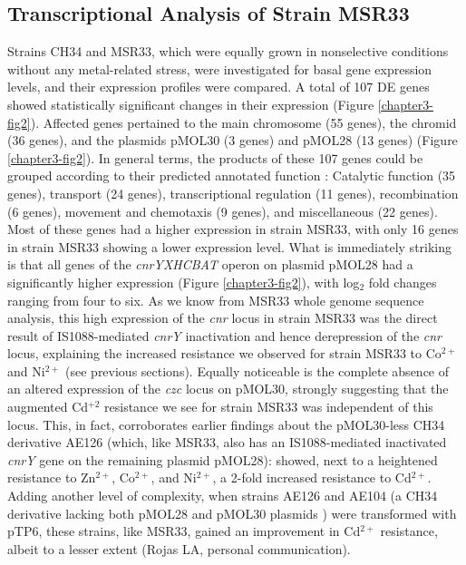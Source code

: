 \subsection{Transcriptional Analysis of Strain MSR33}

Strains CH34 and MSR33, which were equally grown in nonselective conditions without any metal-related stress, were investigated for basal gene expression levels, and their expression profiles were compared. A total of 107 DE genes showed statistically significant changes in their expression (Figure \ref{chapter3-fig2}). Affected genes pertained to the main chromosome (55 genes), the chromid (36 genes), and the plasmids pMOL30 (3 genes) and pMOL28 (13 genes) (Figure \ref{chapter3-fig2}). In general terms, the products of these 107 genes could be grouped according to their predicted annotated function \citep{janssen2010complete}: Catalytic function (35 genes), transport (24 genes), transcriptional regulation (11 genes), recombination (6 genes), movement and chemotaxis (9 genes), and miscellaneous (22 genes). Most of these genes had a higher expression in strain MSR33, with only 16 genes in strain MSR33 showing a lower expression level. What is immediately striking is that all genes of the \textit{cnrYXHCBAT} operon on plasmid pMOL28 had a significantly higher expression (Figure \ref{chapter3-fig2}), with log$_2$ fold changes ranging from four to six. As we know from MSR33 whole genome sequence analysis, this high expression of the \textit{cnr} locus in strain MSR33 was the direct result of IS1088-mediated \textit{cnrY} inactivation and hence derepression of the \textit{cnr} locus, explaining the increased resistance we observed for strain MSR33 to Co$^{2+}$ and Ni$^{2+}$ (see previous sections). Equally noticeable is the complete absence of an altered expression of the \textit{czc} locus on pMOL30, strongly suggesting that the augmented Cd$^{+2}$ resistance we see for strain MSR33 was independent of this locus. This, in fact, corroborates earlier findings about the pMOL30-less CH34 derivative AE126 (which, like MSR33, also has an IS1088-mediated inactivated \textit{cnrY} gene on the remaining plasmid pMOL28):  \citet{vandecraen2016zinc} showed, next to a heightened resistance to Zn$^{2+}$, Co$^{2+}$, and Ni$^{2+}$, a 2-fold increased resistance to Cd$^{2+}$. Adding another level of complexity, when strains AE126 and AE104 (a CH34 derivative lacking both pMOL28 and pMOL30 plasmids \citep{mergeay1985alcaligenes}) were transformed with pTP6, these strains, like MSR33, gained an improvement in Cd$^{2+}$ resistance, albeit to a lesser extent (Rojas LA, personal communication).
